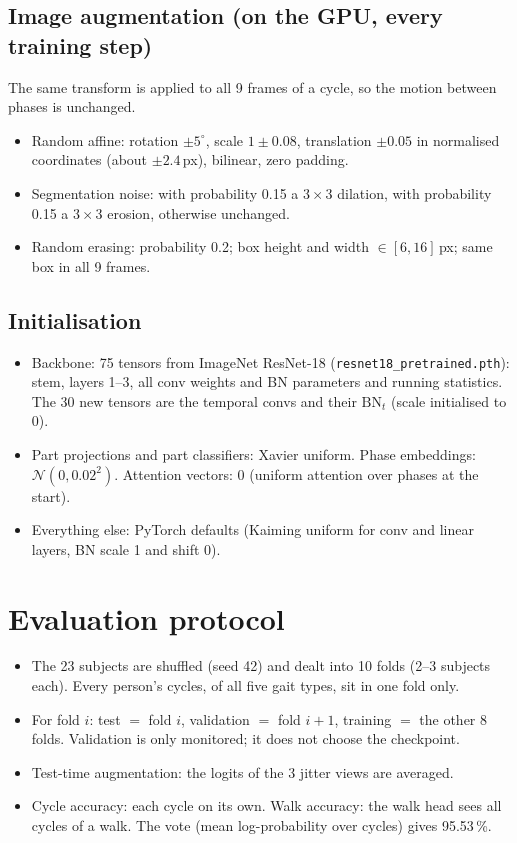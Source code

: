 \documentclass[10pt,a4paper]{article}
\begin{document}
\subsection{Image augmentation (on the GPU, every training step)}\label{sec:aug}
The same transform is applied to all 9 frames of a cycle, so the motion between phases is unchanged.
\begin{itemize}\itemsep0pt
\item Random affine: rotation $\pm5^\circ$, scale $1\pm0.08$, translation $\pm0.05$ in normalised
  coordinates (about $\pm2.4$\,px), bilinear, zero padding.
\item Segmentation noise: with probability 0.15 a $3\times3$ dilation, with probability 0.15 a
  $3\times3$ erosion, otherwise unchanged.
\item Random erasing: probability 0.2; box height and width $\in [6, 16]$\,px; same box in all 9 frames.
\end{itemize}

\subsection{Initialisation}
\begin{itemize}\itemsep0pt
\item Backbone: 75 tensors from ImageNet ResNet-18 (\texttt{resnet18\_pretrained.pth}): stem, layers 1--3,
  all conv weights and BN parameters and running statistics. The 30 new tensors are the temporal
  convs and their $\mathrm{BN}_t$ (scale initialised to 0).
\item Part projections and part classifiers: Xavier uniform. Phase embeddings: $\mathcal N(0, 0.02^2)$.
  Attention vectors: 0 (uniform attention over phases at the start).
\item Everything else: PyTorch defaults (Kaiming uniform for conv and linear layers, BN scale 1 and shift 0).
\end{itemize}

\section{Evaluation protocol}
\begin{itemize}\itemsep0pt
\item The 23 subjects are shuffled (seed 42) and dealt into 10 folds (2--3 subjects each).
  Every person's cycles, of all five gait types, sit in one fold only.
\item For fold $i$: test $=$ fold $i$, validation $=$ fold $i{+}1$, training $=$ the other 8 folds.
  Validation is only monitored; it does not choose the checkpoint.
\item Test-time augmentation: the logits of the 3 jitter views are averaged.
\item Cycle accuracy: each cycle on its own. Walk accuracy: the walk head sees all cycles of a walk.
  The vote (mean log-probability over cycles) gives 95.53\,\%.
\end{itemize}
\end{document}

